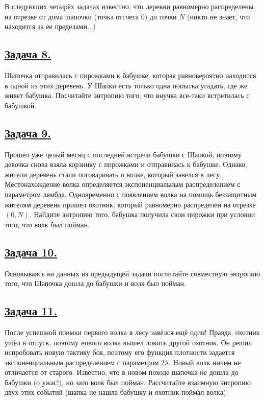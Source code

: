 В следующих четырёх задачах известно, что деревни равномерно распределены на отрезке от дома шапочки (точка отсчета 0) до точки $N$ (никто не знает, что находится за ее пределами...)

\subsection*{\hyperref[sec:sol_problem8]{Задача 8.}}\label{sec:problem8} Шапочка отправилась с пирожками к бабушке, которая равновероятно находится в одной из этих деревень. У Шапки есть только одна попытка угадать, где же живет бабушка. Посчитайте энтропию того, что внучка все-таки встретилась с бабушкой. 

\subsection*{\hyperref[sec:sol_problem9]{Задача 9.}}\label{sec:problem9} Прошел уже целый месяц с последней встречи бабушки с Шапкой, поэтому девочка снова взяла корзинку с пирожками и отправилась к бабушке. Однако, жители деревень стали поговаривать о волке, который завелся в лесу. Местонахождение волка определяется экспоненциальным распределением с параметром лямбда. Одновременно с появлением волка на помощь беззащитным жителям деревень пришел охотник, который равномерно распределен на отрезке $(0, N)$. Найдите энтропию того, бабушка получила свои пирожки при условии того, что волк был пойман.

\subsection*{\hyperref[sec:sol_problem10]{Задача 10.}}\label{sec:problem10} Основываясь на данных из предыдущей задачи посчитайте совместную энтропию того, что Шапочка дошла до бабушки и волк был пойман.

\subsection*{\hyperref[sec:sol_problem11]{Задача 11.}}\label{sec:problem11} После успешной поимки первого волка в лесу завёлся ещё один! Правда, охотник ушёл в отпуск, поэтому нового волка вышел ловить другой охотник. Он решил испробовать новую тактику боя, поэтому его функция плотности задается экспоненциальным распределением с параметром $2\lambda$. Новый волк ничем не отличается от старого. Известно, что в новом походе шапочка не дошла до бабушки (о ужас!), но зато волк был пойман. Рассчитайте взаимную энтропию двух этих событий (шапка не нашла бабушку и охотник поймал волка). 

